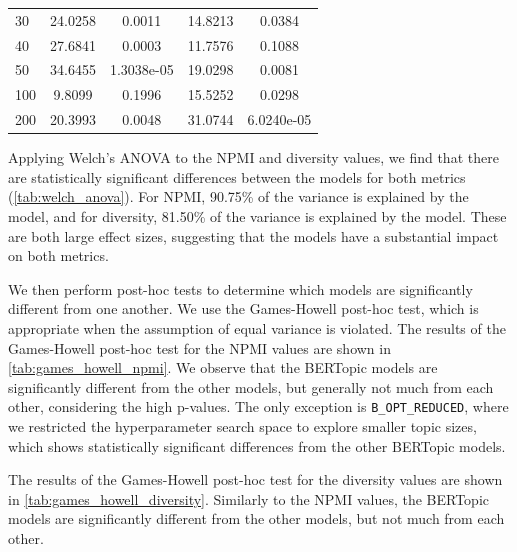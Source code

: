 \begin{table}[htbp]
\begin{tabular}{@{}lcc|cc@{}}
        30                  & 24.0258                           & 0.0011                                 & 14.8213            & 0.0384           \\
        40                  & 27.6841                           & 0.0003                                 & 11.7576            & 0.1088           \\
        50                  & 34.6455                           & 1.3038e-05                             & 19.0298            & 0.0081           \\
        100                 & 9.8099                            & 0.1996                                 & 15.5252            & 0.0298           \\
        200                 & 20.3993                           & 0.0048                                 & 31.0744            & 6.0240e-05       \\ \bottomrule
    \end{tabular}
    \label{tab:levene_bartlett}
\end{table}

Applying Welch's ANOVA to the NPMI and diversity values, we find that there are statistically significant differences between the models for both metrics (\cref{tab:welch_anova}). For NPMI, 90.75\% of the variance is explained by the model, and for diversity, 81.50\% of the variance is explained by the model. These are both large effect sizes, suggesting that the models have a substantial impact on both metrics.

We then perform post-hoc tests to determine which models are significantly different from one another. We use the Games-Howell post-hoc test, which is appropriate when the assumption of equal variance is violated. The results of the Games-Howell post-hoc test for the NPMI values are shown in \cref{tab:games_howell_npmi}. We observe that the BERTopic models are significantly different from the other models, but generally not much from each other, considering the high p-values. The only exception is \texttt{B\_OPT\_REDUCED}, where we restricted the hyperparameter search space to explore smaller topic sizes, which shows statistically significant differences from the other BERTopic models.

The results of the Games-Howell post-hoc test for the diversity values are shown in \cref{tab:games_howell_diversity}. Similarly to the NPMI values, the BERTopic models are significantly different from the other models, but not much from each other.

